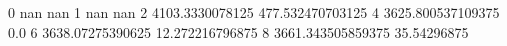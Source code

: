 0 nan nan
1 nan nan
2 4103.3330078125 477.532470703125
4 3625.800537109375 0.0
6 3638.07275390625 12.272216796875
8 3661.343505859375 35.54296875
